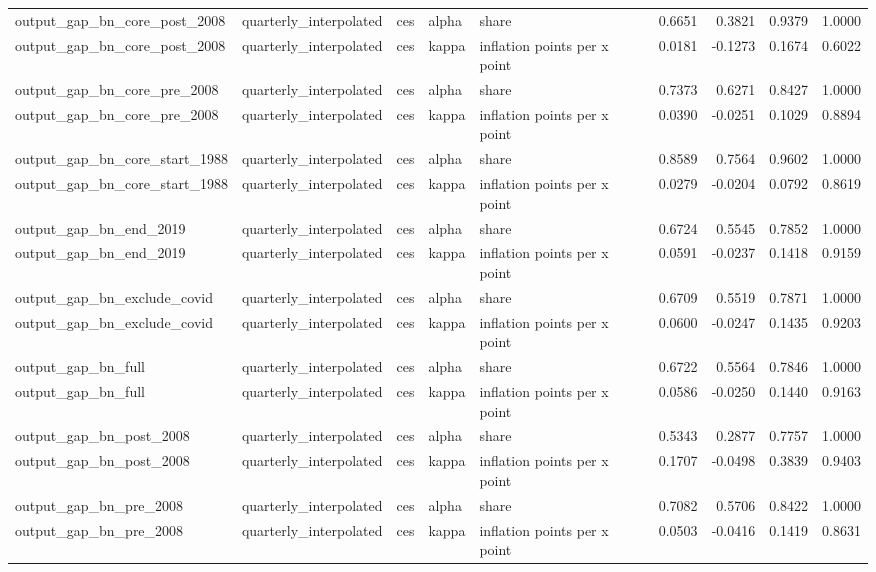 \begin{tabular}{lllllrrrr}
output\_gap\_bn\_core\_post\_2008 & quarterly\_interpolated & ces & alpha & share & 0.6651 & 0.3821 & 0.9379 & 1.0000 \\
output\_gap\_bn\_core\_post\_2008 & quarterly\_interpolated & ces & kappa & inflation points per x point & 0.0181 & -0.1273 & 0.1674 & 0.6022 \\
output\_gap\_bn\_core\_pre\_2008 & quarterly\_interpolated & ces & alpha & share & 0.7373 & 0.6271 & 0.8427 & 1.0000 \\
output\_gap\_bn\_core\_pre\_2008 & quarterly\_interpolated & ces & kappa & inflation points per x point & 0.0390 & -0.0251 & 0.1029 & 0.8894 \\
output\_gap\_bn\_core\_start\_1988 & quarterly\_interpolated & ces & alpha & share & 0.8589 & 0.7564 & 0.9602 & 1.0000 \\
output\_gap\_bn\_core\_start\_1988 & quarterly\_interpolated & ces & kappa & inflation points per x point & 0.0279 & -0.0204 & 0.0792 & 0.8619 \\
output\_gap\_bn\_end\_2019 & quarterly\_interpolated & ces & alpha & share & 0.6724 & 0.5545 & 0.7852 & 1.0000 \\
output\_gap\_bn\_end\_2019 & quarterly\_interpolated & ces & kappa & inflation points per x point & 0.0591 & -0.0237 & 0.1418 & 0.9159 \\
output\_gap\_bn\_exclude\_covid & quarterly\_interpolated & ces & alpha & share & 0.6709 & 0.5519 & 0.7871 & 1.0000 \\
output\_gap\_bn\_exclude\_covid & quarterly\_interpolated & ces & kappa & inflation points per x point & 0.0600 & -0.0247 & 0.1435 & 0.9203 \\
output\_gap\_bn\_full & quarterly\_interpolated & ces & alpha & share & 0.6722 & 0.5564 & 0.7846 & 1.0000 \\
output\_gap\_bn\_full & quarterly\_interpolated & ces & kappa & inflation points per x point & 0.0586 & -0.0250 & 0.1440 & 0.9163 \\
output\_gap\_bn\_post\_2008 & quarterly\_interpolated & ces & alpha & share & 0.5343 & 0.2877 & 0.7757 & 1.0000 \\
output\_gap\_bn\_post\_2008 & quarterly\_interpolated & ces & kappa & inflation points per x point & 0.1707 & -0.0498 & 0.3839 & 0.9403 \\
output\_gap\_bn\_pre\_2008 & quarterly\_interpolated & ces & alpha & share & 0.7082 & 0.5706 & 0.8422 & 1.0000 \\
output\_gap\_bn\_pre\_2008 & quarterly\_interpolated & ces & kappa & inflation points per x point & 0.0503 & -0.0416 & 0.1419 & 0.8631 \\

\end{tabular}
